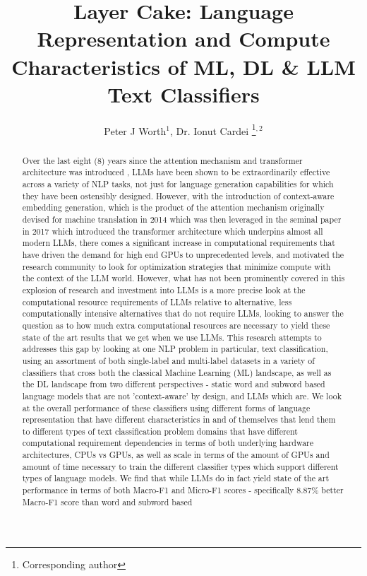 \documentclass[final]{clv2025}
\begin{document}
\title{Layer Cake: Language Representation and Compute Characteristics of ML, DL \& LLM Text Classifiers}

\author{Peter J Worth$^{1}$, Dr. Ionut Cardei \thanks{Corresponding author}$^{,2}$}


\maketitle

\begin{abstract}
Over the last eight (8) years since the attention mechanism and transformer architecture was introduced \cite{vaswani}, LLMs have been shown to be extraordinarily effective across a variety of NLP tasks, not just for language generation capabilities for which they have been ostensibly designed. However, with the introduction of context-aware embedding generation, which is the product of the attention mechanism originally devised for machine translation in 2014 \cite{bahdanau2016neuralmachinetranslationjointly} which was then leveraged in the seminal paper in 2017 which introduced the transformer architecture \cite{vaswani} which underpins almost all modern LLMs, there comes a significant increase in computational requirements that have driven the demand for high end GPUs to unprecedented levels, and motivated the research community to look for optimization strategies that minimize compute with the context of the LLM world. However, what has not been prominently covered in this explosion of research and investment into LLMs is a more precise look at the computational resource requirements of LLMs relative to alternative, less computationally intensive alternatives that do not require LLMs, looking to answer the question as to how much extra computational resources are necessary to yield these state of the art results that we get when we use LLMs. This research attempts to addresses this gap by looking at one NLP problem in particular, text classification, using an assortment of both single-label and multi-label datasets in a variety of classifiers that cross both the classical Machine Learning (ML) landscape, as well as the DL landscape from two different perspectives - static word and subword based language models that are not 'context-aware' by design, and LLMs which are. We look at the overall performance of these classifiers using different forms of language representation that have different characteristics in and of themselves that lend them to different types of text classification problem domains that have different computational requirement dependencies in terms of both underlying hardware architectures, CPUs vs GPUs, as well as scale in terms of the amount of GPUs and amount of time necessary to train the different classifier types which support different types of language models. We find that while LLMs do in fact yield state of the art performance in terms of both Macro-F1 and Micro-F1 scores - specifically 8.87\% better Macro-F1 score than word and subword based 
\end{abstract}
\end{document}
